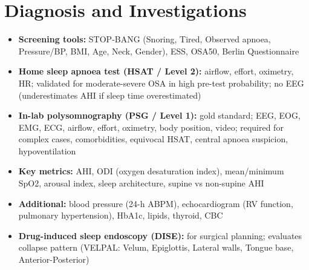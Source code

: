 \section*{Diagnosis and Investigations}
\begin{itemize}
    \item \textbf{Screening tools:} STOP-BANG (Snoring, Tired, Observed apnoea, Pressure/BP, BMI, Age, Neck, Gender), ESS, OSA50, Berlin Questionnaire
    \item \textbf{Home sleep apnoea test (HSAT / Level 2):} airflow, effort, oximetry, HR; validated for moderate-severe OSA in high pre-test probability; no EEG (underestimates AHI if sleep time overestimated)
    \item \textbf{In-lab polysomnography (PSG / Level 1):} gold standard; EEG, EOG, EMG, ECG, airflow, effort, oximetry, body position, video; required for complex cases, comorbidities, equivocal HSAT, central apnoea suspicion, hypoventilation
    \item \textbf{Key metrics:} AHI, ODI (oxygen desaturation index), mean/minimum SpO2, arousal index, sleep architecture, supine vs non-supine AHI
    \item \textbf{Additional:} blood pressure (24-h ABPM), echocardiogram (RV function, pulmonary hypertension), HbA1c, lipids, thyroid, CBC
    \item \textbf{Drug-induced sleep endoscopy (DISE):} for surgical planning; evaluates collapse pattern (VELPAL: Velum, Epiglottis, Lateral walls, Tongue base, Anterior-Posterior)
\end{itemize}

